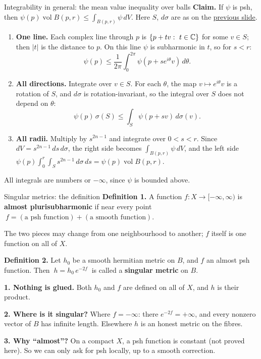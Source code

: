 \begin{frame}{Integrability in general: the mean value inequality over balls}
\label{fr:psh-ball-mean}
\textbf{Claim.} If \(\psi\) is psh, then \(\psi(p)\operatorname{vol}B(p,r)\le\int_{B(p,r)}\psi\,dV\). Here \(S\), \(d\sigma\) are as on the \hyperlink{fr:polar-cn}{previous slide}.
\begin{enumerate}
\item \textbf{One line.} Each complex line through \(p\) is \(\{p+tv:\ t\in\mathbb C\}\) for some \(v\in S\); then \(|t|\) is the distance to \(p\). On this line \(\psi\) is subharmonic in \(t\), so for \(s<r\):
\[
\psi(p)\le\frac{1}{2\pi}\int_0^{2\pi}\psi(p+se^{i\theta}v)\,d\theta .
\]
\item \textbf{All directions.} Integrate over \(v\in S\). For each \(\theta\), the map \(v\mapsto e^{i\theta}v\) is a rotation of \(S\), and \(d\sigma\) is rotation-invariant, so the integral over \(S\) does not depend on \(\theta\):
\[
\psi(p)\,\sigma(S)\le\int_S\psi(p+sv)\,d\sigma(v).
\]
\item \textbf{All radii.} Multiply by \(s^{2n-1}\) and integrate over \(0<s<r\). Since \(dV=s^{2n-1}\,ds\,d\sigma\), the right side becomes \(\int_{B(p,r)}\psi\,dV\), and the left side \(\psi(p)\int_0^r\!\!\int_S s^{2n-1}\,d\sigma\,ds=\psi(p)\operatorname{vol}B(p,r)\).
\end{enumerate}
All integrals are numbers or \(-\infty\), since \(\psi\) is bounded above.
\end{frame}

\begin{frame}{Singular metrics: the definition}
\label{fr:singular-def}
\textbf{Definition 1.} A function \(f:X\to[-\infty,\infty)\) is \textbf{almost plurisubharmonic} if near every point
\(\ f=(\text{a psh function})+(\text{a smooth function}).\)
\par
The two pieces may change from one neighbourhood to another; \(f\) itself is one function on all of \(X\).
\par\medskip
\textbf{Definition 2.} Let \(h_0\) be a smooth hermitian metric on \(B\), and \(f\) an almost psh function. Then
\(\ \boxed{h=h_0\,e^{-2f}}\ \)
is called a \textbf{singular metric} on \(B\).
\par\medskip
\textbf{1. Nothing is glued.} Both \(h_0\) and \(f\) are defined on all of \(X\), and \(h\) is their product.
\par
\textbf{2. Where is it singular?} Where \(f=-\infty\): there \(e^{-2f}=+\infty\), and every nonzero vector of \(B\) has infinite length. Elsewhere \(h\) is an honest metric on the fibres.
\par
\textbf{3. Why ``almost''?} On a compact \(X\), a psh function is constant (not proved here). So we can only ask for psh locally, up to a smooth correction.
\end{frame}

